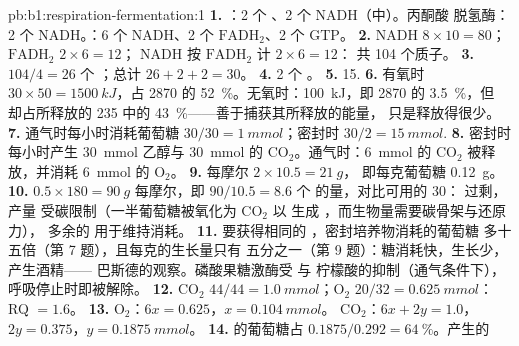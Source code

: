 \begin{solution}{pb:b1:respiration-fermentation:1}
\textbf{1.} ：2 个 、2 个 NADH（中）。丙酮酸
脱氢酶：2 个 NADH。：6 个 NADH、2 个 $\mathrm{FADH_2}$、2 个 GTP。
\textbf{2.}  NADH $8\times 10 = 80$；$\mathrm{FADH_2}$
$2\times 6 = 12$； NADH 按 $\mathrm{FADH_2}$ 计 $2\times 6 = 12$：
共 104 个质子。
\textbf{3.} $104/4 = 26$ 个 ；总计 $26 + 2 + 2 = 30$。
\textbf{4.} 2 个 。
\textbf{5.} 15.
\textbf{6.} 有氧时 $30\times 50 = \qty{1500}{kJ}$，占
2870 的 \qty{52}{\%}。无氧时：\qty{100}{kJ}，即 2870 的 \qty{3.5}{\%}，但
却占所释放的 235 中的 \qty{43}{\%}——善于捕获其所释放的能量，
只是释放得很少。
\textbf{7.} 通气时每小时消耗葡萄糖 $30/30 = \qty{1}{mmol}$；密封时
$30/2 = \qty{15}{mmol}$.
\textbf{8.} 密封时每小时产生 \qty{30}{mmol} 乙醇与 \qty{30}{mmol} 的
$\mathrm{CO_2}$。通气时：\qty{6}{mmol} 的 $\mathrm{CO_2}$
被释放，并消耗 \qty{6}{mmol} 的 $\mathrm{O_2}$。
\textbf{9.} 每摩尔 $2\times 10.5 = \qty{21}{g}$，
即每克葡萄糖 \qty{0.12}{g}。
\textbf{10.} $0.5\times 180 = \qty{90}{g}$ 每摩尔，即 $90/10.5 =
8.6$ 个  的量，对比可用的 30： 过剩，产量
受碳限制（一半葡萄糖被氧化为 $\mathrm{CO_2}$ 以
生成 ，而生物量需要碳骨架与还原力），
多余的  用于维持消耗。
\textbf{11.} 要获得相同的 ，密封培养物消耗的葡萄糖
多十五倍（第 7 题），且每克的生长量只有
五分之一（第 9 题）：糖消耗快，生长少，产生酒精——
巴斯德的观察。磷酸果糖激酶受  与
柠檬酸的抑制（通气条件下），呼吸停止时即被解除。
\textbf{12.} $\mathrm{CO_2}$ $44/44 = \qty{1.0}{mmol}$；$\mathrm{O_2}$
$20/32 = \qty{0.625}{mmol}$：RQ $= 1.6$。
\textbf{13.} $\mathrm{O_2}$：$6x = 0.625$，$x = \qty{0.104}{mmol}$。
$\mathrm{CO_2}$：$6x + 2y = 1.0$，$2y = 0.375$，$y = \qty{0.1875}{mmol}$。
\textbf{14.} 的葡萄糖占 $0.1875/0.292 = \qty{64}{\%}$。产生的

\end{solution}
